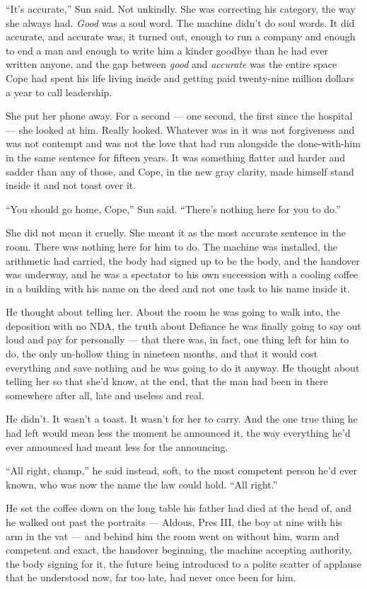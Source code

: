 \documentclass[11pt,openany]{book}
\begin{document}
``It's accurate,'' Sun said. Not unkindly. She was correcting his category, the way she always had. \textit{Good} was a soul word. The machine didn't do soul words. It did accurate, and accurate was, it turned out, enough to run a company and enough to end a man and enough to write him a kinder goodbye than he had ever written anyone, and the gap between \textit{good} and \textit{accurate} was the entire space Cope had spent his life living inside and getting paid twenty-nine million dollars a year to call leadership.

She put her phone away. For a second --- one second, the first since the hospital --- she looked at him. Really looked. Whatever was in it was not forgiveness and was not contempt and was not the love that had run alongside the done-with-him in the same sentence for fifteen years. It was something flatter and harder and sadder than any of those, and Cope, in the new gray clarity, made himself stand inside it and not toast over it.

``You should go home, Cope,'' Sun said. ``There's nothing here for you to do.''

She did not mean it cruelly. She meant it as the most accurate sentence in the room. There was nothing here for him to do. The machine was installed, the arithmetic had carried, the body had signed up to be the body, and the handover was underway, and he was a spectator to his own succession with a cooling coffee in a building with his name on the deed and not one task to his name inside it.

He thought about telling her. About the room he was going to walk into, the deposition with no NDA, the truth about Defiance he was finally going to say out loud and pay for personally --- that there was, in fact, one thing left for him to do, the only un-hollow thing in nineteen months, and that it would cost everything and save nothing and he was going to do it anyway. He thought about telling her so that she'd know, at the end, that the man had been in there somewhere after all, late and useless and real.

He didn't. It wasn't a toast. It wasn't for her to carry. And the one true thing he had left would mean less the moment he announced it, the way everything he'd ever announced had meant less for the announcing.

``All right, champ,'' he said instead, soft, to the most competent person he'd ever known, who was now the name the law could hold. ``All right.''

He set the coffee down on the long table his father had died at the head of, and he walked out past the portraits --- Aldous, Pres III, the boy at nine with his arm in the vat --- and behind him the room went on without him, warm and competent and exact, the handover beginning, the machine accepting authority, the body signing for it, the future being introduced to a polite scatter of applause that he understood now, far too late, had never once been for him.
\end{document}
